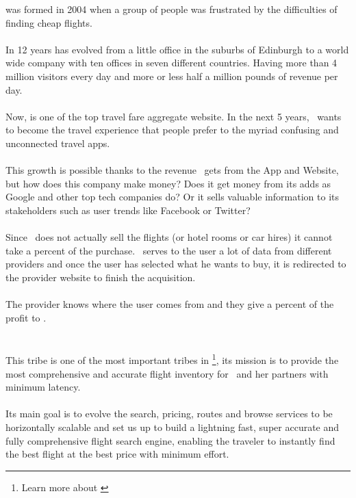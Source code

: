 \company\cite{skyscanner_strategy} was formed in 2004 when a group of people was frustrated by the difficulties of finding cheap flights.
\\\\
In 12 years has evolved from a little office in the suburbs of Edinburgh to a world wide company with ten offices in seven different countries. Having more than 4 million visitors every day and more or less half a million pounds of revenue per day.
\\\\
Now, is one of the top travel fare aggregate website. In the next 5 years, \company\ wants to become the travel experience that people prefer to the myriad confusing and unconnected travel apps.
\\\\
This growth is possible thanks to the revenue \company\ gets from the App and Website, but how does this company make money? Does it get money from its adds as Google and other top tech companies do? Or it sells valuable information to its stakeholders such as user trends like Facebook or Twitter?
\\\\
Since \company\ does not actually sell the flights (or hotel rooms or car hires) it cannot take a percent of the purchase. \company\ serves to the user a lot of data from different providers and once the user has selected what he wants to buy, it is redirected to the provider website to finish the acquisition.
\\\\
The provider knows where the user comes from and they give a percent of the profit to \company.

\section{\tribe}

This tribe\cite{marketplace_engine_home} is one of the most important tribes in \company\footnote{Learn more about \textit{}}, its mission is to provide the most comprehensive and accurate flight inventory for \company\ and her partners with minimum latency.
\\\\
Its main goal is to evolve the search, pricing, routes and browse services to be horizontally scalable and set us up to build a lightning fast, super accurate and fully comprehensive flight search engine, enabling the traveler to instantly find the best flight at the best price with minimum effort.

